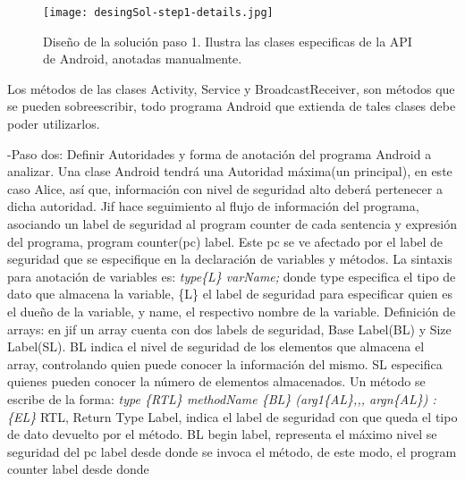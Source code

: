 \begin{figure}[h!]
	\begin{center}
	\texttt{[image: desingSol-step1-details.jpg]}
	\end{center}
	\caption{Diseño de la solución paso 1. Ilustra las clases especificas de la
	API de Android, anotadas manualmente.}
	\label{fig:desingSol-step1}
\end{figure}

Los métodos de las clases Activity, Service y BroadcastReceiver, son métodos
que se pueden sobreescribir, todo programa Android que extienda de tales clases
debe poder utilizarlos.

-Paso dos: 
Definir Autoridades y forma de anotación del programa Android a analizar.
Una clase Android tendrá una Autoridad máxima(un principal), en este caso Alice,
así que, información con nivel de seguridad alto deberá pertenecer a dicha
autoridad.\newline
Jif hace seguimiento al flujo de información del programa, asociando un label
de seguridad al program counter de cada sentencia y expresión del programa,
program counter(pc) label. Este pc se ve afectado por el label
de seguridad que se especifique en la declaración de variables y
métodos.\newline 
La sintaxis para anotación de variables es: \newline 
\emph{ type\{L\} varName; } \newline donde type especifica el tipo de dato que
almacena la variable, \{L\} el label de seguridad  para especificar quien es el
dueño de la variable, y name, el respectivo nombre de la variable.\newline
Definición de arrays:\newline
en jif un array cuenta con dos labels de seguridad, Base Label(BL) y Size
Label(SL). BL indica el nivel de seguridad de los elementos que almacena el
array, controlando quien puede conocer la información del mismo. SL especifica
quienes pueden conocer la número de elementos almacenados.\newline
Un método se escribe de la forma:\newline
\emph{ type \{RTL\} methodName \{BL\} (arg1\{AL\},,, argn\{AL\}) :\{EL\}
}\newline RTL, Return Type Label, indica el label de seguridad con que
queda el tipo de dato devuelto por el método.\newline 
BL begin label, representa el máximo nivel se seguridad del pc label desde donde
se invoca el método, de este modo, el program counter label desde donde
